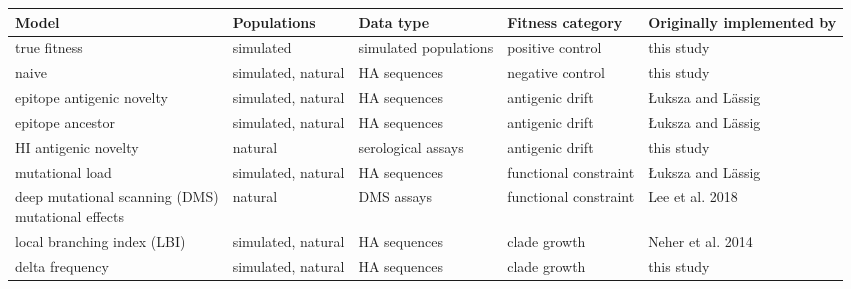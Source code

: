 \begin{tabular*}{1.4\textwidth}{lllll}
\toprule
Model                                                        & Populations        & Data type             & Fitness category      & Originally implemented by                   \\
\midrule
true fitness                                                 & simulated          & simulated populations & positive control      & this study                      \\
naive                                                        & simulated, natural & HA sequences          & negative control      & this study                      \\
epitope antigenic novelty                                    & simulated, natural & HA sequences          & antigenic drift       & {\L}uksza and L\"assig \cite{Luksza:2014hj} \\
epitope ancestor                                             & simulated, natural & HA sequences          & antigenic drift       & {\L}uksza and L\"assig \cite{Luksza:2014hj} \\
HI antigenic novelty                                         & natural            & serological assays    & antigenic drift       & this study                      \\
mutational load                                              & simulated, natural & HA sequences          & functional constraint & {\L}uksza and L\"assig \cite{Luksza:2014hj} \\
\makecell{deep mutational scanning (DMS) \\ mutational effects} & natural            & DMS assays            & functional constraint & Lee et al. 2018 \cite{Lee2018}              \\
local branching index (LBI)                                  & simulated, natural & HA sequences          & clade growth          & Neher et al. 2014 \cite{Neher:2014eu}       \\
delta frequency                                              & simulated, natural & HA sequences          & clade growth          & this study                      \\
\bottomrule
\end{tabular*}
